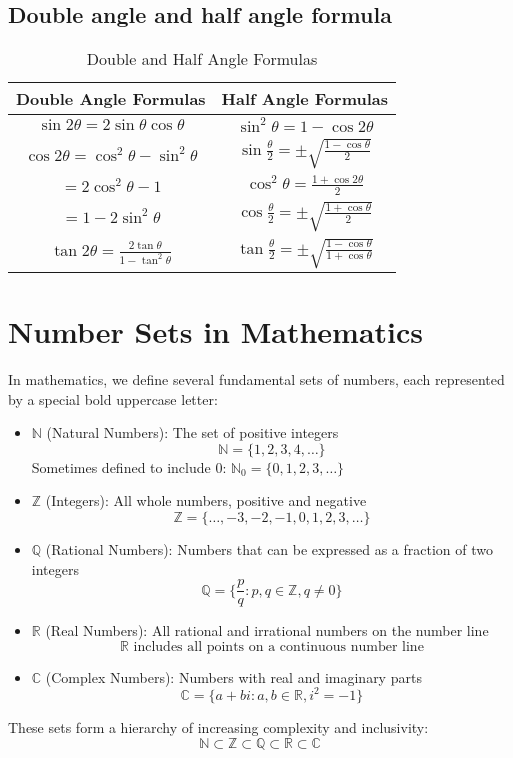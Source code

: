 \subsection{Double angle and half angle formula}
\begin{table}[h!]
\centering
\renewcommand{\arraystretch}{1.5}
\begin{tabular}{|c|c|}
\hline
\textbf{Double Angle Formulas} & \textbf{Half Angle Formulas} \\ \hline
$\sin 2\theta = 2\sin\theta \cos\theta$ & $\sin^2\theta = 1 - \cos 2\theta$ \\ 
$\cos 2\theta = \cos^2\theta - \sin^2\theta$ & $\sin \frac{\theta}{2} = \pm \sqrt{\frac{1 - \cos\theta}{2}}$ \\
$= 2\cos^2\theta - 1$ & $\cos^2\theta = \frac{1 + \cos 2\theta}{2}$ \\ 
$= 1 - 2\sin^2\theta$ & $\cos \frac{\theta}{2} = \pm \sqrt{\frac{1 + \cos\theta}{2}}$ \\
$\tan 2\theta = \frac{2\tan\theta}{1 - \tan^2\theta}$ & $\tan \frac{\theta}{2} = \pm \sqrt{\frac{1 - \cos\theta}{1 + \cos\theta}}$ \\ \hline
\end{tabular}
\caption{Double and Half Angle Formulas}
\end{table}


\section{Number Sets in Mathematics}

In mathematics, we define several fundamental sets of numbers, each represented by a special bold uppercase letter:

\begin{itemize}
    \item $\mathbb{N}$ (Natural Numbers): The set of positive integers 
    \[
    \mathbb{N} = \{1, 2, 3, 4, \ldots\}
    \]
    Sometimes defined to include 0: $\mathbb{N}_0 = \{0, 1, 2, 3, \ldots\}$

    \item $\mathbb{Z}$ (Integers): All whole numbers, positive and negative 
    \[
    \mathbb{Z} = \{\ldots, -3, -2, -1, 0, 1, 2, 3, \ldots\}
    \]

    \item $\mathbb{Q}$ (Rational Numbers): Numbers that can be expressed as a fraction of two integers
    \[
    \mathbb{Q} = \{\frac{p}{q} : p, q \in \mathbb{Z}, q \neq 0\}
    \]

    \item $\mathbb{R}$ (Real Numbers): All rational and irrational numbers on the number line
    \[
    \mathbb{R} \text{ includes all points on a continuous number line}
    \]

    \item $\mathbb{C}$ (Complex Numbers): Numbers with real and imaginary parts
    \[
    \mathbb{C} = \{a + bi : a, b \in \mathbb{R}, i^2 = -1\}
    \]
\end{itemize}

These sets form a hierarchy of increasing complexity and inclusivity:
\[
\mathbb{N} \subset \mathbb{Z} \subset \mathbb{Q} \subset \mathbb{R} \subset \mathbb{C}
\]